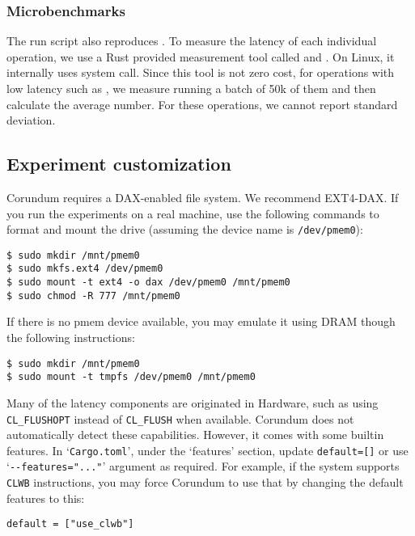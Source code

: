 {\subsubsection{Microbenchmarks}
The run script also reproduces . To measure the latency of each individual operation, we use a Rust provided measurement tool called  and . On Linux, it internally uses  system call. Since this tool is not zero cost, for operations with low latency such as , we measure running a batch of 50k of them and then calculate the average number. For these operations, we cannot report standard deviation.

\subsection{Experiment customization}
\label{sec:custom}

Corundum requires a DAX-enabled file system. We recommend EXT4-DAX. If you run the experiments on a real machine, use the following commands to format and mount the drive (assuming the device name is \verb+/dev/pmem0+):

\begin{verbatim}
$ sudo mkdir /mnt/pmem0
$ sudo mkfs.ext4 /dev/pmem0
$ sudo mount -t ext4 -o dax /dev/pmem0 /mnt/pmem0
$ sudo chmod -R 777 /mnt/pmem0
\end{verbatim}

If there is no pmem device available, you may emulate it using DRAM though the following instructions:

\begin{verbatim}
$ sudo mkdir /mnt/pmem0
$ sudo mount -t tmpfs /dev/pmem0 /mnt/pmem0
\end{verbatim}

Many of the latency components are originated in Hardware, such as using \verb+CL_FLUSHOPT+ instead of \verb+CL_FLUSH+ when available. Corundum does not automatically detect these capabilities. However, it comes with some builtin features. In `\verb+Cargo.toml+', under the `features' section, update \verb+default=[]+ or use `\verb+--features="..."+' argument as required. For example, if the system supports \verb+CLWB+ instructions, you may force Corundum to use that by changing the default features to this:

\begin{center}
  \verb+default = ["use_clwb"]+
\end{center}

}

